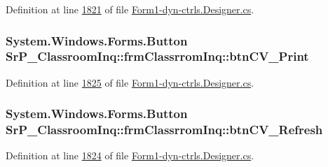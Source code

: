 \-Definition at line \hyperlink{_form1-dyn-ctrls_8_designer_8cs_source_l01821}{1821} of file \hyperlink{_form1-dyn-ctrls_8_designer_8cs_source}{\-Form1-\/dyn-\/ctrls.\-Designer.\-cs}.

\hypertarget{class_sr_p___classroom_inq_1_1frm_classrrom_inq_aa974c0ec46e2bca7bea74774e0f460d4}{
\subsubsection[{btn\-C\-V\-\_\-\-Print}]{\setlength{\rightskip}{0pt plus 5cm}\-System.\-Windows.\-Forms.\-Button {\bf \-Sr\-P\-\_\-\-Classroom\-Inq\-::frm\-Classrrom\-Inq\-::btn\-C\-V\-\_\-\-Print}}}
\label{class_sr_p___classroom_inq_1_1frm_classrrom_inq_aa974c0ec46e2bca7bea74774e0f460d4}


\-Definition at line \hyperlink{_form1-dyn-ctrls_8_designer_8cs_source_l01825}{1825} of file \hyperlink{_form1-dyn-ctrls_8_designer_8cs_source}{\-Form1-\/dyn-\/ctrls.\-Designer.\-cs}.

\hypertarget{class_sr_p___classroom_inq_1_1frm_classrrom_inq_acab3b8f1dd8b8c6298dd2c11aa764a29}{
\subsubsection[{btn\-C\-V\-\_\-\-Refresh}]{\setlength{\rightskip}{0pt plus 5cm}\-System.\-Windows.\-Forms.\-Button {\bf \-Sr\-P\-\_\-\-Classroom\-Inq\-::frm\-Classrrom\-Inq\-::btn\-C\-V\-\_\-\-Refresh}}}
\label{class_sr_p___classroom_inq_1_1frm_classrrom_inq_acab3b8f1dd8b8c6298dd2c11aa764a29}


\-Definition at line \hyperlink{_form1-dyn-ctrls_8_designer_8cs_source_l01824}{1824} of file \hyperlink{_form1-dyn-ctrls_8_designer_8cs_source}{\-Form1-\/dyn-\/ctrls.\-Designer.\-cs}.

